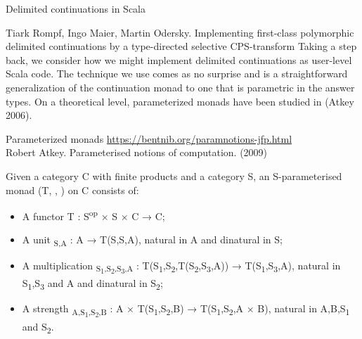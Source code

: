 \documentclass{beamer}
\begin{document}
    \begin{frame}[fragile]{Delimited continuations in Scala}
        \begin{block}{Tiark Rompf, Ingo Maier, Martin Odersky.
        Implementing first-class polymorphic delimited continuations
        by a type-directed selective CPS-transform}
            Taking a step back, we consider how we might implement delimited continuations as \alert{user-level} Scala code.
            The technique we use comes as no surprise and is a straightforward generalization of the continuation monad
            to one that is parametric in the answer types. On a theoretical level, \alert{parameterized monads} have been
            studied in (Atkey 2006).
        \end{block}
    \end{frame}

    \begin{frame}[fragile]{Parameterized monads}
        \url{https://bentnib.org/paramnotions-jfp.html} \\
        Robert Atkey. Parameterised notions of computation. (2009)
        \begin{definition}
            Given a category C with finite products and a category S,
            an S-parameterised monad (T, \eta, \mu) on C consists of:
            \begin{itemize}
                \item A functor T : S\textsuperscript{op} × S × C → C;
                \item  A unit \eta\textsubscript{S,A} : A → T(S,S,A), natural in A and dinatural in S;
                \item  A multiplication \mu\textsubscript{S\textsubscript{1},S\textsubscript{2},S\textsubscript{3},A} : T(S\textsubscript{1},S\textsubscript{2},T(S\textsubscript{2},S\textsubscript{3},A)) → T(S\textsubscript{1},S\textsubscript{3},A), natural
                in S\textsubscript{1},S\textsubscript{3} and A and dinatural in S\textsubscript{2};
                \item  A strength \tau\textsubscript{A,S\textsubscript{1},S\textsubscript{2},B} : A × T(S\textsubscript{1},S\textsubscript{2},B) → T(S\textsubscript{1},S\textsubscript{2},A × B), natural in
                A,B,S\textsubscript{1} and S\textsubscript{2}.
            \end{itemize}
        \end{definition}
    \end{frame}
\end{document}
